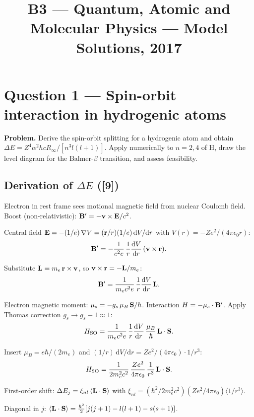 \documentclass[11pt]{article}
\title{B3 --- Quantum, Atomic and Molecular Physics --- Model Solutions, 2017}
\author{}
\date{}
\newcommand{\de}{\mathrm{d}}
\begin{document}
\maketitle

\section*{Question 1 --- Spin-orbit interaction in hydrogenic atoms}

\textbf{Problem.} Derive the spin-orbit splitting for a hydrogenic atom and obtain
$\Delta E = Z^4\alpha^2 hcR_\infty / [n^3 l(l+1)]$. Apply numerically to $n=2,4$
of H, draw the level diagram for the Balmer-$\beta$ transition, and assess feasibility.

\subsection*{Derivation of $\Delta E$ ([9])}

Electron in rest frame sees motional magnetic field from nuclear Coulomb field.
Boost (non-relativistic): $\vb B' = -\vb v\times\vb E/c^2$.

Central field $\vb E = -(1/e)\,\vb\nabla V = (\vb r/r)(1/e)\,\de V/\de r$ with
$V(r)=-Ze^2/(4\pi\epsilon_0 r)$:
\[
\vb B' = -\frac{1}{c^2 e}\,\frac{1}{r}\frac{\de V}{\de r}\,(\vb v\times\vb r).
\]

Substitute $\vb L = m_e\,\vb r\times\vb v$, so $\vb v\times\vb r = -\vb L/m_e$:
\[
\vb B' = \frac{1}{m_e c^2 e}\,\frac{1}{r}\frac{\de V}{\de r}\,\vb L.
\]

Electron magnetic moment: $\vb\mu_s = -g_s\,\mu_B\,\vb S/\hbar$. Interaction
$H = -\vb\mu_s\cdot\vb B'$. Apply Thomas correction $g_s\to g_s-1\approx 1$:
\[
H_{\text{SO}} = \frac{1}{m_e c^2 e}\,\frac{1}{r}\frac{\de V}{\de r}\,\frac{\mu_B}{\hbar}\,\vb L\cdot\vb S.
\]

Insert $\mu_B = e\hbar/(2m_e)$ and $(1/r)\,\de V/\de r = Ze^2/(4\pi\epsilon_0)\cdot 1/r^3$:
\begin{equation}
H_{\text{SO}} = \frac{1}{2 m_e^2 c^2}\,\frac{Ze^2}{4\pi\epsilon_0}\,\frac{1}{r^3}\,\vb L\cdot\vb S.
\label{eq:HSO}
\end{equation}

First-order shift: $\Delta E_j = \xi_{nl}\,\langle\vb L\cdot\vb S\rangle$ with
$\xi_{nl} = (\hbar^2/2m_e^2 c^2)(Ze^2/4\pi\epsilon_0)\langle 1/r^3\rangle$.

Diagonal in $j$: $\langle\vb L\cdot\vb S\rangle = \tfrac{\hbar^2}{2}[j(j+1)-l(l+1)-s(s+1)]$.
\end{document}
